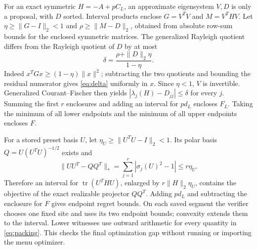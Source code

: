\documentclass[11pt]{article}
\newcommand{\tr}{\operatorname{tr}}
\begin{document}
For an exact symmetric $H=-A+pC_L$, an approximate eigensystem $V,D$ is
only a proposal, with $D$ sorted. Interval products enclose
$G=V^TV$ and $M=V^THV$. Let $\eta\ge\|G-I\|_2<1$ and
$\rho\ge\|M-D\|_2$, obtained from absolute row-sum bounds for the
enclosed symmetric matrices. The generalized Rayleigh quotient differs from
the Rayleigh quotient of $D$ by at most
\begin{equation}
 \delta=\frac{\rho+\|D\|_2\eta}{1-\eta}.                  \label{eq:delta}
\end{equation}
Indeed $x^TGx\ge(1-\eta)\|x\|^2$; subtracting the two quotients and
bounding the residual numerator gives \eqref{eq:delta} uniformly in $x$.
Since $\eta<1$, $V$ is invertible. Generalized Courant--Fischer then yields
$|\lambda_j(H)-D_{jj}|\le\delta$ for every $j$. Summing the first $r$
enclosures and adding an interval for $pd_L$ encloses $F_L$.
Taking the minimum of all lower endpoints and the minimum of all upper
endpoints encloses $F$.

For a stored preset basis $U$, let
$\eta_U\ge\|U^TU-I\|_2<1$. Its polar basis
$Q=U(U^TU)^{-1/2}$ exists and
\begin{equation}
 \|UU^T-QQ^T\|_*=
 \sum_{j=1}^r|\sigma_j(U)^2-1|\le r\eta_U.
\end{equation}
Therefore an interval for $\tr(U^THU)$, enlarged by
$r\|H\|_2\eta_U$, contains the objective of the exact realizable
projector $QQ^T$. Adding $pd_L$ and subtracting the enclosure for $F$
gives endpoint regret bounds. On each saved segment the verifier chooses
one fixed site and uses its two endpoint bounds; convexity extends them
to the interval. Lower witnesses use outward arithmetic for every quantity
in \eqref{eq:packing}. This checks the final optimization gap without
running or importing the menu optimizer.







\end{document}
